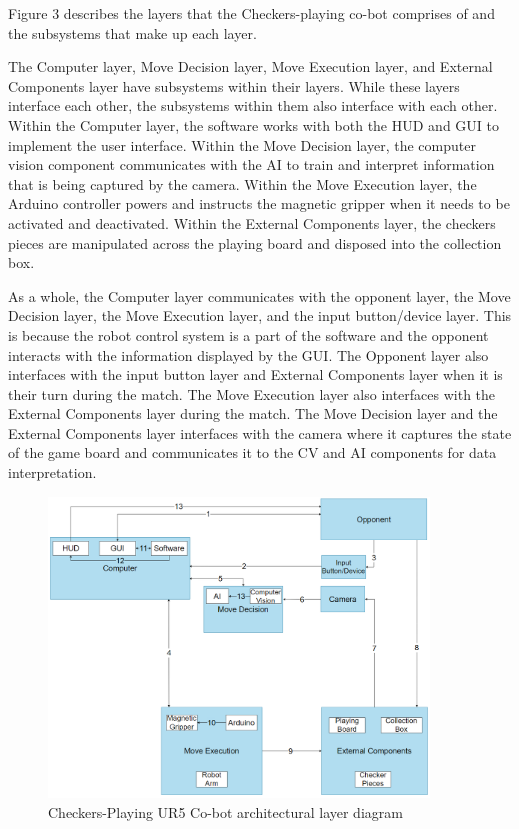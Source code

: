 
Figure 3 describes the layers that the Checkers-playing co-bot comprises of and the subsystems that make up each layer. 

The Computer layer, Move Decision layer, Move Execution layer, and External Components layer have subsystems within their layers. While these layers interface each other, the subsystems within them also interface with each other. Within the Computer layer, the software works with both the HUD and GUI to implement the user interface. Within the Move Decision layer, the computer vision component communicates with the AI to train and interpret information that is being captured by the camera. Within the Move Execution layer, the Arduino controller powers and instructs the magnetic gripper when it needs to be activated and deactivated. Within the External Components layer, the checkers pieces are manipulated across the playing board and disposed into the collection box.

As a whole, the Computer layer communicates with the opponent layer, the Move Decision layer, the Move Execution layer, and the input button/device layer. This is because the robot control system is a part of the software and the opponent interacts with the information displayed by the GUI. The Opponent layer also interfaces with the input button layer and External Components layer when it is their turn during the match. The Move Execution layer also interfaces with the External Components layer during the match. The Move Decision layer and the External Components layer interfaces with the camera where it captures the state of the game board and communicates it to the CV and AI components for data interpretation.  

\begin{figure}[h!]
	\centering
    \includegraphics[width=0.90\textwidth]{images/data_flow_actual.png}
 \caption{Checkers-Playing UR5 Co-bot architectural layer diagram}
\end{figure}
